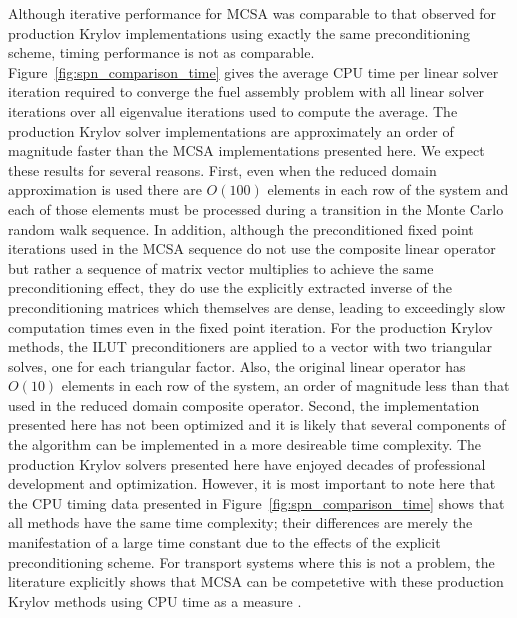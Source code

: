 Although iterative performance for MCSA was comparable to that
observed for production Krylov implementations using exactly the same
preconditioning scheme, timing performance is not as
comparable. Figure~\ref{fig:spn_comparison_time} gives the average CPU
time per linear solver iteration required to converge the fuel
assembly problem with all linear solver iterations over all eigenvalue
iterations used to compute the average. The production Krylov solver
implementations are approximately an order of magnitude faster than
the MCSA implementations presented here. We expect these results for
several reasons. First, even when the reduced domain approximation is
used there are $O(100)$ elements in each row of the system and each of
those elements must be processed during a transition in the Monte
Carlo random walk sequence. In addition, although the preconditioned
fixed point iterations used in the MCSA sequence do not use the
composite linear operator but rather a sequence of matrix vector
multiplies to achieve the same preconditioning effect, they do use the
explicitly extracted inverse of the preconditioning matrices which
themselves are dense, leading to exceedingly slow computation times
even in the fixed point iteration. For the production Krylov methods,
the ILUT preconditioners are applied to a vector with two triangular
solves, one for each triangular factor. Also, the original linear
operator has $O(10)$ elements in each row of the system, an order of
magnitude less than that used in the reduced domain composite
operator. Second, the implementation presented here has not been
optimized and it is likely that several components of the algorithm
can be implemented in a more desireable time complexity. The
production Krylov solvers presented here have enjoyed decades of
professional development and optimization. However, it is most
important to note here that the CPU timing data presented in
Figure~\ref{fig:spn_comparison_time} shows that all methods have the
same time complexity; their differences are merely the manifestation
of a large time constant due to the effects of the explicit
preconditioning scheme. For transport systems where this is not a
problem, the literature explicitly shows that MCSA can be competetive
with these production Krylov methods using CPU time as a measure
\citep{evans_monte_2012}.

